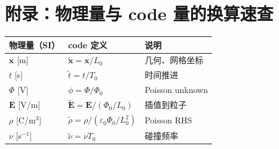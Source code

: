 \documentclass[11pt,a4paper]{ctexart}
\begin{document}
\section{附录：物理量与 code 量的换算速查}
\begin{center}
\begin{tabular}{@{}lll@{}}
\toprule
物理量（SI） & code 定义 & 说明 \\
\midrule
$\bm{x}$ [m] & $\tilde{\bm{x}}=\bm{x}/L_0$ & 几何、网格坐标 \\
$t$ [s] & $\tilde{t}=t/T_0$ & 时间推进 \\
$\Phi$ [V] & $\phi=\Phi/\Phi_0$ & Poisson unknown \\
$\bm{E}$ [V/m] & $\tilde{\bm{E}}=\bm{E}/(\Phi_0/L_0)$ & 插值到粒子 \\
$\rho$ [C/m$^3$] & $\tilde{\rho}=\rho/(\varepsilon_0\Phi_0/L_0^2)$ & Poisson RHS \\
$\nu$ [s$^{-1}$] & $\tilde{\nu}=\nu T_0$ & 碰撞频率 \\
\bottomrule
\end{tabular}
\end{center}
\end{document}
